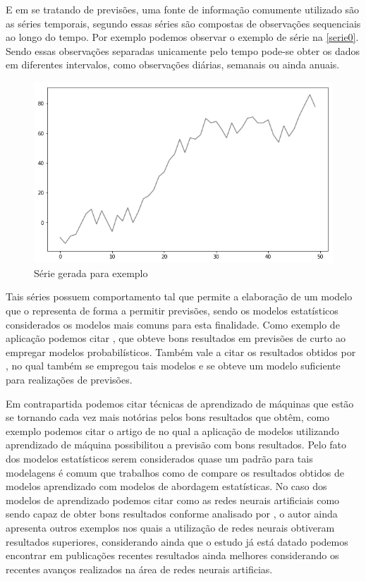 \documentclass[
	12pt,
	oneside,
	a4paper,
	english,
	brazil
]{abntex2}
\begin{document}
E em se tratando de previsões, uma fonte de informação comumente utilizado são 
as séries temporais, segundo  essas séries são compostas de 
observações sequenciais ao longo do tempo. Por exemplo podemos observar o 
exemplo de série na \autoref{serie0}. Sendo essas observações separadas 
unicamente pelo tempo pode-se obter os dados em diferentes intervalos, como 
observações diárias, semanais ou ainda anuais.

\begin{figure}[ht]
    \centering
    \caption{Série gerada para exemplo}\label{serie0}
    \includegraphics[width=.6\linewidth]{images/serie_exemplo.png}
\end{figure}

Tais séries possuem comportamento tal que permite a elaboração de um modelo que 
o representa de forma a permitir previsões, sendo os modelos estatísticos 
considerados os modelos mais comuns para esta finalidade. Como exemplo de 
aplicação podemos citar , que obteve bons resultados em 
previsões de curto ao empregar modelos probabilísticos. Também vale a citar os 
resultados obtidos por , no qual também se empregou tais 
modelos e se obteve um modelo suficiente para realizações de previsões.

Em contrapartida podemos citar técnicas de aprendizado de máquinas que estão se 
tornando cada vez mais notórias pelos bons resultados que obtêm, como exemplo 
podemos citar o artigo de  no qual a aplicação de modelos 
utilizando aprendizado de máquina possibilitou a previsão com bons resultados.  
Pelo fato dos modelos estatísticos serem considerados quase um padrão para tais 
modelagens é comum que trabalhos como de  compare os 
resultados obtidos de modelos aprendizado com modelos de abordagem estatísticas.  
No caso dos modelos de aprendizado podemos citar como as redes neurais 
artificiais como sendo capaz de obter bons resultados conforme analisado por 
, o autor ainda apresenta outros exemplos nos quais a 
utilização de redes neurais obtiveram resultados superiores, considerando ainda 
que o estudo já está datado podemos encontrar em publicações recentes resultados 
ainda melhores considerando os recentes avanços realizados na área de redes 
neurais artificias.
\end{document}
